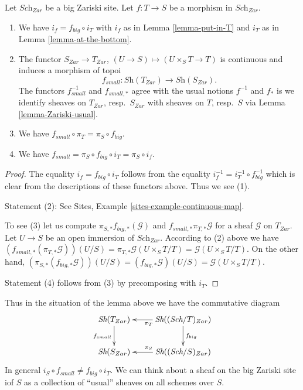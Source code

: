 \begin{lemma}
\label{lemma-morphism-big-small}
Let $\textit{Sch}_{Zar}$ be a big Zariski site.
Let $f : T \to S$ be a morphism in $\textit{Sch}_{Zar}$.
\begin{enumerate}
\item We have $i_f = f_{big} \circ i_T$ with $i_f$ as in
Lemma \ref{lemma-put-in-T} and $i_T$ as in Lemma \ref{lemma-at-the-bottom}.
\item The functor $S_{Zar} \to T_{Zar}$,
$(U \to S) \mapsto (U \times_S T \to T)$ is continuous and induces
a morphism of topoi
$$
f_{small} :
\textit{Sh}(T_{Zar})
\longrightarrow
\textit{Sh}(S_{Zar}).
$$
The functors $f_{small}^{-1}$ and $f_{small, *}$ agree with
the usual notions $f^{-1}$ and $f_*$ is we identify sheaves
on $T_{Zar}$, resp.\ $S_{Zar}$ with sheaves on $T$, resp.\ $S$
via Lemma \ref{lemma-Zariski-usual}.
\item We have $f_{small} \circ \pi_T = \pi_S \circ f_{big}$.
\item We have $f_{small} = \pi_S \circ f_{big} \circ i_T = \pi_S \circ i_f$.
\end{enumerate}
\end{lemma}

\begin{proof}
The equality $i_f = f_{big} \circ i_T$ follows from the
equality $i_f^{-1} = i_T^{-1} \circ f_{big}^{-1}$ which is
clear from the descriptions of these functors above.
Thus we see (1).

\medskip\noindent
Statement (2): See Sites, Example \ref{sites-example-continuous-map}.

\medskip\noindent
To see (3) let us compute $\pi_{S, *}f_{big, *}(\mathcal{G})$ and
$f_{small, *} \pi_{T, *}\mathcal{G}$
for a sheaf $\mathcal{G}$ on $T_{Zar}$. Let $U \to S$ be an open
immersion of $\textit{Sch}_{Zar}$. According to
(2) above we have $(f_{small, *}(\pi_{T, *}\mathcal{G}))(U/S) =
\pi_{T, *}\mathcal{G}(U \times_S T/T) = \mathcal{G}(U\times_S T/T)$.
On the other hand,
$(\pi_{S, *}(f_{big, *}\mathcal{G}))(U/S) =
(f_{big, *}\mathcal{G})(U/S) =
\mathcal{G}(U\times_S T/T)$.

\medskip\noindent
Statement (4) follows from (3) by precomposing with $i_T$.
\end{proof}

\noindent
Thus in the situation of the lemma above we have the commutative diagram
$$
\xymatrix{
\textit{Sh}(T_{Zar}) \ar[d]_{f_{small}} &
\textit{Sh}((\textit{Sch}/T)_{Zar}) \ar[d]^{f_{big}} \ar[l]^{\pi_T}\\
\textit{Sh}(S_{Zar}) &
\textit{Sh}((\textit{Sch}/S)_{Zar}) \ar[l]_{\pi_S}
}
$$
In general $i_S \circ f_{small} \not = f_{big} \circ i_T$.
We can think about a sheaf on the big Zariski site iof $S$ as a collection
of ``usual'' sheaves on all schemes over $S$.

